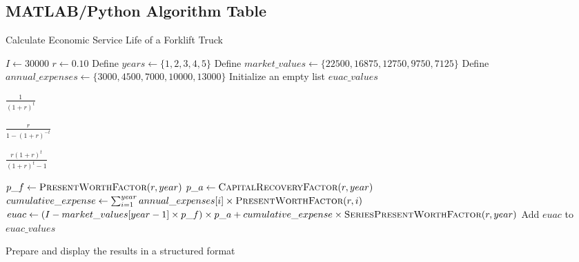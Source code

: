 \documentclass[12pt]{article}
\begin{document}
\newpage
\subsection*{MATLAB/Python Algorithm Table}
\begin{algorithm}
\caption{Calculate Economic Service Life of a Forklift Truck}
\begin{algorithmic}[1]

\State $I \gets 30000$ 
\State $r \gets 0.10$ 
\State Define $years \gets \{1, 2, 3, 4, 5\}$
\State Define $market\_values \gets \{22500, 16875, 12750, 9750, 7125\}$
\State Define $annual\_expenses \gets \{3000, 4500, 7000, 10000, 13000\}$
\State Initialize an empty list $euac\_values$

    \State \Return $\frac{1}{(1 + r)^t}$
\EndFunction

    \State \Return $\frac{r}{1 - (1 + r)^{-t}}$
\EndFunction

    \State \Return $\frac{r(1 + r)^t}{(1 + r)^t - 1}$
\EndFunction

    \State $p\_f \gets \Call{PresentWorthFactor}{r, year}$
    \State $p\_a \gets \Call{CapitalRecoveryFactor}{r, year}$
    \State $cumulative\_expense \gets \sum_{i=1}^{year} annual\_expenses[i] \times \Call{PresentWorthFactor}{r, i}$
    \State $euac \gets (I - market\_values[year - 1] \times p\_f) \times p\_a + cumulative\_expense \times \Call{SeriesPresentWorthFactor}{r, year}$
    \State Add $euac$ to $euac\_values$
\EndFor

\State Prepare and display the results in a structured format

\end{algorithmic}
\end{algorithm}
\end{document}
